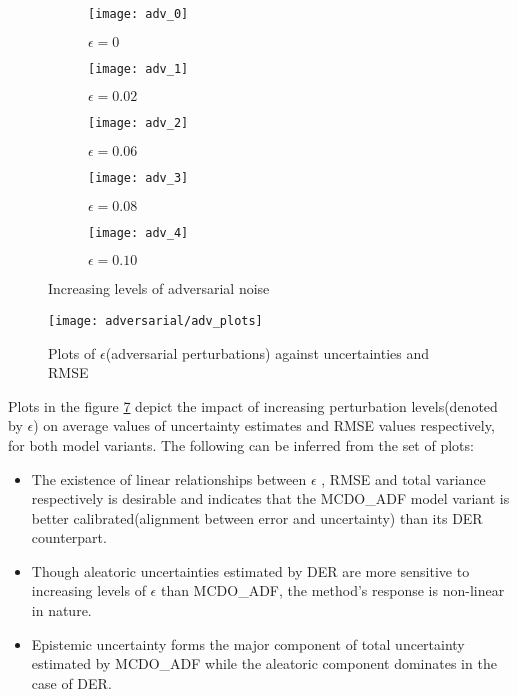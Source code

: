 \begin{figure}[H]
	\centering
	\begin{subfigure}[b]{0.19\textwidth}
		\centering
		\texttt{[image: adv\_0]}
		\caption{$\epsilon=0$}
		\label{fig:y equals x}
	\end{subfigure}
	\hfill
	\begin{subfigure}[b]{0.19\textwidth}
		\centering
		\texttt{[image: adv\_1]}
		\caption{$\epsilon=0.02$}
		\label{fig:three sin x}
	\end{subfigure}
	\hfill
	\begin{subfigure}[b]{0.19\textwidth}
		\centering
		\texttt{[image: adv\_2]}
		\caption{$\epsilon=0.06$}
		\label{fig:five over x}
	\end{subfigure}
	\hfill
	\begin{subfigure}[b]{0.19\textwidth}
		\centering
		\texttt{[image: adv\_3]}
		\caption{$\epsilon=0.08$}
		\label{fig:five over x}
	\end{subfigure}
	\hfill
	\begin{subfigure}[b]{0.19\textwidth}
		\centering
		\texttt{[image: adv\_4]}
		\caption{$\epsilon=0.10$}
		\label{fig:five over x}
	\end{subfigure}
	\caption{Increasing levels of adversarial noise}
	\label{fig_adv_example}
\end{figure}

\begin{figure}[H]
	\centering
	\texttt{[image: adversarial/adv\_plots]}
	\caption{Plots of $\epsilon$(adversarial perturbations) against uncertainties and RMSE}
	\label{fig_adv_analysis}
\end{figure}



Plots in the figure \ref{fig_adv_analysis} depict the impact of increasing perturbation levels(denoted by $\epsilon$) on average values of uncertainty estimates and RMSE values respectively, for both model variants. The following can be inferred from the set of plots:
\begin{itemize}
	\item The existence of linear relationships between $\epsilon$ , RMSE and total variance respectively is desirable and indicates that the MCDO\_ADF model variant is better calibrated(alignment between error and uncertainty) than its DER counterpart.
	\item  Though aleatoric uncertainties estimated by DER are more sensitive to increasing levels of $\epsilon$ than MCDO\_ADF, the method's response is non-linear in nature.
	\item  Epistemic uncertainty forms the major component of total uncertainty estimated by MCDO\_ADF while the aleatoric component dominates in the case of DER.
\end{itemize}
